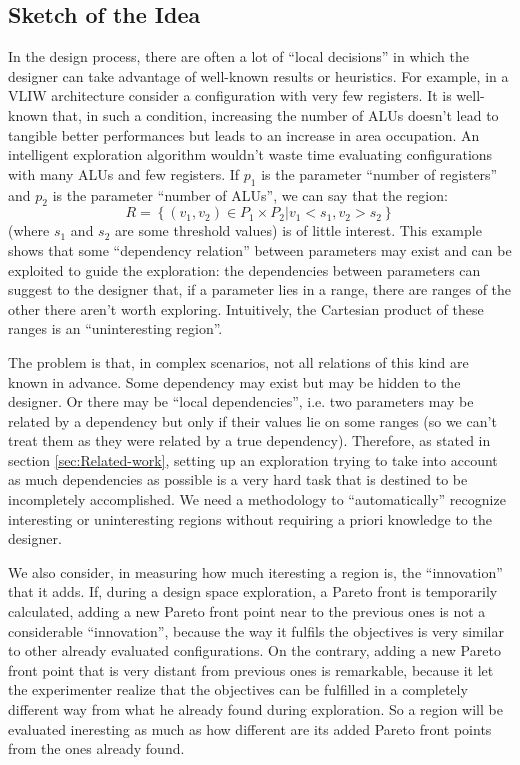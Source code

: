 \subsection{Sketch of the Idea}

In the design process, there are often a lot of ``local decisions''
in which the designer can take advantage of well-known results or
heuristics. For example, in a VLIW architecture consider a configuration
with very few registers. It is well-known that, in such a condition,
increasing the number of ALUs doesn't lead to tangible better performances
but leads to an increase in area occupation. An intelligent exploration
algorithm wouldn't waste time evaluating configurations with many
ALUs and few registers. If $p_{1}$ is the parameter ``number of
registers'' and $p_{2}$ is the parameter ``number of ALUs'', we
can say that the region:
\[
R=\left\{ \left.\left(v_{1},v_{2}\right)\in P_{1}\times P_{2}\right|v_{1}<s_{1},v_{2}>s_{2}\right\} 
\]
 (where $s_{1}$ and $s_{2}$ are some threshold values) is of little
interest. This example shows that some ``dependency relation'' between
parameters may exist and can be exploited to guide the exploration:
the dependencies between parameters can suggest to the designer that,
if a parameter lies in a range, there are ranges of the other there
aren't worth exploring. Intuitively, the Cartesian product of these
ranges is an ``uninteresting region''.

The problem is that, in complex scenarios, not all relations of this
kind are known in advance. Some dependency may exist but may be hidden
to the designer. Or there may be ``local dependencies'', i.e. two
parameters may be related by a dependency but only if their values
lie on some ranges (so we can't treat them as they were related by
a true dependency). Therefore, as stated in section \ref{sec:Related-work},
setting up an exploration trying to take into account as much dependencies
as possible is a very hard task that is destined to be incompletely
accomplished. We need a methodology to ``automatically'' recognize
interesting or uninteresting regions without requiring a priori knowledge
to the designer.

We also consider, in measuring how much iteresting a region is, the
``innovation'' that it adds. If, during a design space exploration,
a Pareto front is temporarily calculated, adding a new Pareto front
point near to the previous ones is not a considerable ``innovation'',
because the way it fulfils the objectives is very similar to other
already evaluated configurations. On the contrary, adding a new Pareto
front point that is very distant from previous ones is remarkable,
because it let the experimenter realize that the objectives can be
fulfilled in a completely different way from what he already found
during exploration. So a region will be evaluated ineresting as much
as how different are its added Pareto front points from the ones already
found.

